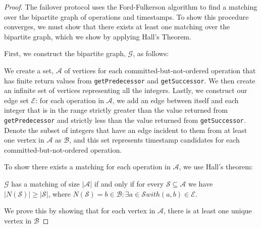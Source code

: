 \begin{proof}
    The failover protocol uses the Ford-Fulkerson algorithm to find a matching over the bipartite graph of operations and timestamps. To show this procedure converges, we must show that there exists at least one matching over the bipartite graph, which we show by applying Hall's Theorem.

    First, we construct the bipartite graph, $\mathcal{G}$, as follows:

    We create a set, $\mathcal{A}$ of vertices for each committed-but-not-ordered operation that has finite return values from \texttt{getPredecessor} and \texttt{getSuccessor}. We then create an infinite set of vertices representing all the integers. Lastly, we construct our edge set $\mathcal{E}$: for each operation in $\mathcal{A}$, we add an edge between itself and each integer that is in the range strictly greater than the value returned from \texttt{getPredecessor} and strictly less than the value returned from \texttt{getSuccessor}. Denote the subset of integers that have an edge incident to them from at least one vertex in $\mathcal{A}$ as $\mathcal{B}$, and this set represents timestamp candidates for each committed-but-not-ordered operation.

    To show there exists a matching for each operation in $\mathcal{A}$, we use Hall's theorem:
    
    $\mathcal{G}$ has a matching of size $|\mathcal{A}|$ if and only if for every $\mathcal{S} \subseteq \mathcal{A}$ we have $|N(\mathcal{S})|\geq|\mathcal{S}|$, where $N(\mathcal{S}) = {b \in \mathcal{B} : \exists a \in \mathcal{S} with (a, b) \in \mathcal{E}}$.

    We prove this by showing that for each vertex in $\mathcal{A}$, there is at least one unique vertex in $\mathcal{B}$
\end{proof}


